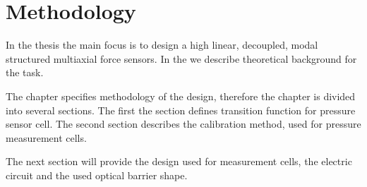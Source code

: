 \chapter{Methodology}
\label{chapter:methodology}
In the thesis the main focus is to design a high linear, decoupled, modal structured multiaxial force sensors.
In the  we describe theoretical background for the
task. 

The chapter specifies methodology of the design, therefore the chapter is divided into several sections. The first the  section 
defines transition function for pressure sensor cell. The second section  describes the calibration method, used for pressure measurement cells.

The next  section will provide the design used for measurement cells, the electric circuit and the used optical barrier shape.






